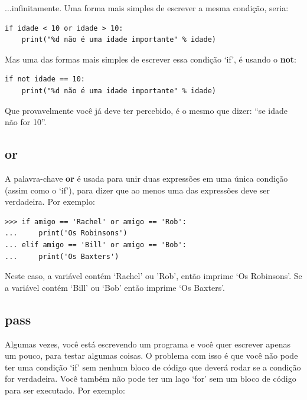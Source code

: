 \noindent
$\ldots$infinitamente. Uma forma mais simples de escrever a mesma condição, seria:

\begin{listing}
\begin{verbatim}
if idade < 10 or idade > 10:
    print("%d não é uma idade importante" % idade)
\end{verbatim}
\end{listing}

\noindent
Mas uma das formas mais simples de escrever essa condição `if', é usando o \textbf{not}:

\begin{listing}
\begin{verbatim}
if not idade == 10:
    print("%d não é uma idade importante" % idade)
\end{verbatim}
\end{listing}

\noindent
Que provavelmente você já deve ter percebido, é o mesmo que dizer: ``se idade não for 10''.

\subsection*{or}

A palavra-chave \textbf{or} é usada para unir duas expressões em uma única condição (assim como o `if'), para dizer que ao menos uma das expressões deve ser verdadeira. Por exemplo:

\begin{listingignore}
\begin{verbatim}
>>> if amigo == 'Rachel' or amigo == 'Rob':
...     print('Os Robinsons')
... elif amigo == 'Bill' or amigo == 'Bob':
...     print('Os Baxters')
\end{verbatim}
\end{listingignore}

Neste caso, a variável  contém `Rachel' ou 'Rob', então imprime `Os Robinsons'. Se a variável  contém `Bill' ou `Bob' então imprime `Os Baxters'.

\subsection*{pass}

Algumas vezes, você está escrevendo um programa e você quer escrever apenas um pouco, para testar algumas coisas. O problema com isso é que você não pode ter uma condição `if' sem nenhum bloco de código que deverá rodar se a condição for verdadeira. Você também não pode ter um laço `for' sem um bloco de código para ser executado. Por exemplo:

